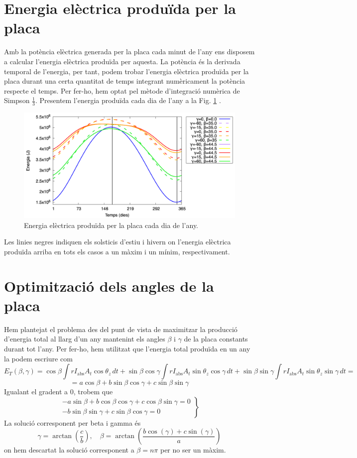 \documentclass[11pt]{article}
\begin{document}
\section{Energia elèctrica produïda per la placa}

Amb la potència elèctrica generada per la placa cada minut de l'any ens disposem a calcular l'energia elèctrica produïda per aquesta. La potència és la derivada temporal de l'energia, per tant, podem trobar l'energia elèctrica produïda per la placa durant una certa quantitat de temps integrant numèricament la potència respecte el temps. Per fer-ho, hem optat pel mètode d'integració numèrica de Simpson $\frac{1}{3}$. Presentem l'energia produïda cada dia de l'any a la Fig. \ref{fig: energies} .


\begin{figure}[h]
    \centering
    \includegraphics[width=0.75\linewidth]{energia.png}
    \caption{Energia elèctrica produïda per la placa cada dia de l'any.}
    \label{fig: energies}
\end{figure}

Les linies negres indiquen els solsticis d'estiu i hivern on l'energia elèctrica produïda arriba en tots els casos a un màxim i un mínim, respectivament.

\section{Optimització dels angles de la placa}

Hem plantejat el problema des del punt de vista de maximitzar la producció d'energia total al llarg d'un any mantenint els angles $\beta$ i $\gamma$ de la placa constants durant tot l'any. Per fer-ho, hem utilitzat que l'energia total produïda en un any la podem escriure com
\[
E_T(\beta, \gamma) = \cos \beta \int r I_{\text{abs}} A_{t} \cos \theta_{z} \, dt
+ \sin \beta \cos \gamma \int r I_{\text{abs}} A_{t} \sin \theta_{z} \cos \gamma \, dt
+ \sin \beta \sin \gamma \int r I_{\text{abs}} A_{t} \sin \theta_{z} \sin \gamma \, dt=
\]
\[
= a\cos \beta
+ b\sin \beta \cos \gamma
+ c\sin \beta \sin \gamma
\]
Igualant el gradent a 0, trobem que
\[
\left.
\begin{aligned}
-a\sin \beta + b\cos \beta \cos \gamma + c\cos \beta \sin \gamma = 0 \\
-b\sin \beta \sin \gamma + c\sin \beta \cos \gamma = 0
\end{aligned}
\right\}
\]
La solució corresponent per beta i gamma és
\[
\gamma = \arctan\left(\frac{c}{b}\right), \quad \beta = \arctan\left(\frac{b \cos(\gamma) + c \sin(\gamma)}{a}\right)
\]
on hem descartat la solució corresponent a $\beta=n\pi$ per no ser un màxim.
\end{document}
